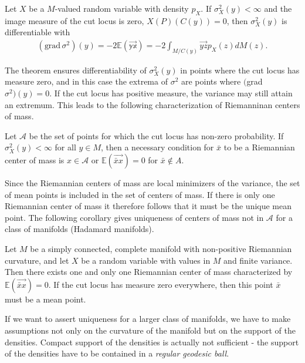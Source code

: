 \begin{theorem}
Let $X$ be a $M$-valued random variable with density $p_X$. If $\sigma^2_X(y) < \infty$ and the image measure of the cut locus is zero, $X(P)(C(y)) = 0$, then $\sigma^2_X(y)$ is differentiable with
\begin{align*}
(\text{grad} \, \sigma^2) (y) = -2 \mathbb{E(\overrightarrow{yx})} = - 2 \int_{M/C(y)} \overrightarrow{yz} p_X(z) d M(z).
\end{align*}
\end{theorem}
The theorem ensures differentiability of $\sigma^2_X(y)$ in points where the cut locus has measure zero, and in this case the extrema of $\sigma^2$ are points where $($grad $\sigma^2) (y) = 0$. If the cut locus has positive measure, the variance may still attain an extremum. This leads to the following characterization of Riemanninan centers of mass.

\begin{corollary}
Let $\mathcal{A}$ be the set of points for which the cut locus has non-zero probability. If $\sigma^2_X(y) < \infty$ for all $y \in M$, then a necessary condition for $\bar{x}$ to be a Riemannian center of mass is $x \in \mathcal{A}$ or $\mathbb{E}(\overrightarrow{\bar{x}x}) = 0$ for $\bar{x} \notin A$.
\end{corollary}
Since the Riemannian centers of mass are local minimizers of the variance, the set of mean points is included in the set of centers of mass. If there is only one Riemannian center of mass it therefore follows that it must be the unique mean point. The following corollary gives uniqueness of centers of mass not in $\mathcal{A}$ for a class of manifolds (Hadamard manifolds).

\begin{corollary}
Let $M$ be a simply connected, complete manifold with non-positive Riemannian curvature, and let $X$ be a random variable with values in $M$ and finite variance. Then there exists one and only one Riemannian center of mass characterized by $\mathbb{E}(\overrightarrow{\bar{x}x}) = 0$. If the cut locus has measure zero everywhere, then this point $\bar{x}$ must be a mean point. 
\end{corollary}
If we want to assert uniqueness for a larger class of manifolds, we have to make assumptions not only on the curvature of the manifold but on the support of the densities. Compact support of the densities is actually not sufficient - the support of the densities have to be contained in a \textit{regular geodesic ball}. 

